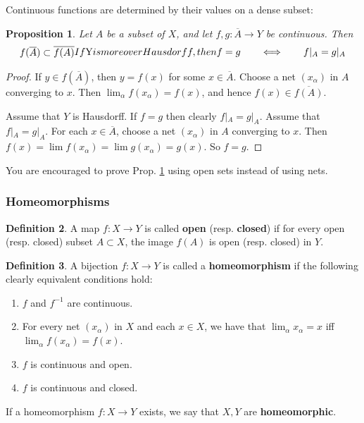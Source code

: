\documentclass[12pt,b5paper,notitlepage]{article}
\theoremstyle{definition}
\newtheorem{df}{Definition}[section]
\theoremstyle{plain}
\newtheorem{pp}[df]{Proposition}
\newcommand{\ovl}{\overline}
\numberwithin{equation}{section}
\begin{document}
Continuous functions are determined by their values on a dense subset: 

\begin{pp}\label{lb196}
Let $A$ be a subset of $X$, and let $f,g:\ovl A\rightarrow Y$ be continuous. Then
\begin{subequations}
\begin{gather}
f(\ovl A)\subset\ovl{f(A)}  \label{eq80}
\end{gather}
If $Y$ is moreover Hausdorff, then
\begin{gather}
f=g\qquad\Longleftrightarrow\qquad f|_A=g|_A
\end{gather}
\end{subequations}
\end{pp}
\begin{proof}
If $y\in f(\ovl A)$, then $y=f(x)$ for some $x\in\ovl A$. Choose a net $(x_\alpha)$ in $A$ converging to $x$. Then $\lim_\alpha f(x_\alpha)=f(x)$, and hence $f(x)\in\ovl {f(A)}$.

Assume that $Y$ is Hausdorff. If $f=g$ then clearly $f|_A=g|_A$. Assume that $f|_A=g|_A$. For each $x\in\ovl A$, choose a net $(x_\alpha)$ in $A$ converging to $x$. Then $f(x)=\lim f(x_\alpha)=\lim g(x_\alpha)=g(x)$. So $f=g$.
\end{proof}


You are encouraged to prove Prop. \ref{lb196} using open sets instead of using nets.



\subsubsection{Homeomorphisms}

\begin{df}
A map $f:X\rightarrow Y$ is called \textbf{open} (resp. \textbf{closed})   if for every open (resp. closed) subset $A\subset X$, the image $f(A)$ is open (resp. closed) in $Y$.
\end{df}


\begin{df}
A bijection $f:X\rightarrow Y$ is called a \textbf{homeomorphism}  if the following clearly equivalent conditions hold:
\begin{enumerate}[label=(\arabic*)]
\item $f$ and $f^{-1}$ are continuous.
\item For every net $(x_\alpha)$ in $X$ and each $x\in X$, we have that  $\lim_\alpha x_\alpha=x$ iff $\lim_\alpha f(x_\alpha)=f(x)$.
\item $f$ is continuous and open.
\item $f$ is continuous and closed.
\end{enumerate}
If a homeomorphism $f:X\rightarrow Y$ exists, we say that $X,Y$ are \textbf{homeomorphic}.
\end{df}
\end{document}
